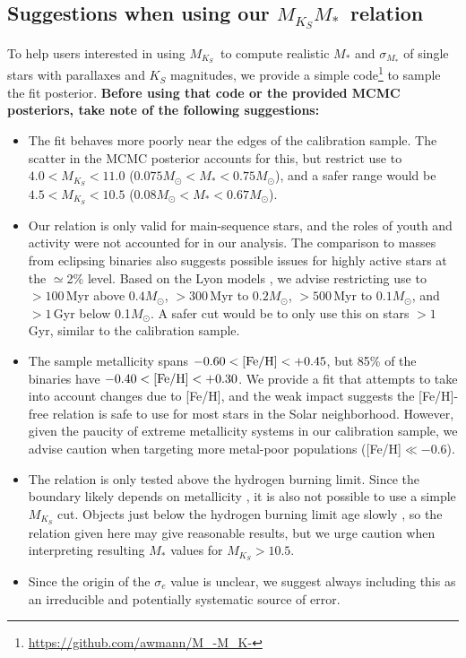 \documentclass[twocolumn]{aastex62}
\newcommand{\mks}{$M_{K_S}$}
\newcommand{\mmk}{$M_{K_S}$\textendash$M_*$}
\begin{document}
\subsection{Suggestions when using our \mmk\ relation}\label{sec:caveats}

To help users interested in using \mks\ to compute realistic $M_*$ and $\sigma_{M_*}$ of single stars with parallaxes and $K_S$ magnitudes, we provide a simple code\footnote{\href{https://github.com/awmann/M_-M_K-}{https://github.com/awmann/M\_-M\_K-}} to sample the fit posterior. {\bf Before using that code or the provided MCMC posteriors, take note of the following suggestions:}
\begin{itemize}
\item The fit behaves more poorly near the edges of the calibration sample. The scatter in the MCMC posterior accounts for this, but restrict use to $4.0<M_{K_S}<11.0$ ($0.075M_\odot<M_*<0.75M_\odot$), and a safer range would be $4.5<M_{K_S}<10.5$ ($0.08M_\odot<M_*<0.67M_\odot$). 

\item Our relation is only valid for main-sequence stars, and the roles of youth and activity were not accounted for in our analysis. The comparison to masses from eclipsing binaries also suggests possible issues for highly active stars at the $\simeq$2\% level. Based on the Lyon models \citep{BHAC15}, we advise restricting use to $>100$\,Myr above $0.4M_\odot$, $>300$\,Myr to $0.2M_\odot$, $>500$\,Myr to $0.1M_\odot$, and $>1$\,Gyr below 0.1$M_\odot$. A safer cut would be to only use this on stars $>1$ Gyr, similar to the calibration sample.

\item The sample metallicity spans $-0.60<\rm{[Fe/H]}<+0.45$, but 85\% of the binaries have $-0.40<\rm{[Fe/H]}<+0.30$. We provide a fit that attempts to take into account changes due to [Fe/H], and the weak impact suggests the [Fe/H]-free relation is safe to use for most stars in the Solar neighborhood. However, given the paucity of extreme metallicity systems in our calibration sample, we advise caution when targeting more metal-poor populations ([Fe/H]$\ll-0.6$). 

\item The relation is only tested above the hydrogen burning limit. Since the boundary likely depends on metallicity \citep{2001RvMP...73..719B}, it is also not possible to use a simple $M_{K_S}$ cut. Objects just below the hydrogen burning limit age slowly \citep{BHAC15}, so the relation given here may give reasonable results, but we urge caution when interpreting resulting $M_*$ values for $M_{K_S}>10.5$. 

\item Since the origin of the $\sigma_e$ value is unclear, we suggest always including this as an irreducible and potentially systematic source of error. 

\end{itemize}
\end{document}

